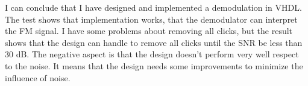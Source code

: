 I can conclude that I have designed and implemented a demodulation in VHDL. The test shows that implementation works, that the demodulator can interpret the FM signal. I have some problems about removing all clicks, but the result shows that the design can handle to remove all clicks until the SNR be less than 30 dB. The negative aspect is that the design doesn't perform very well respect to the noise. It means that the design needs some improvements to minimize the influence of noise.